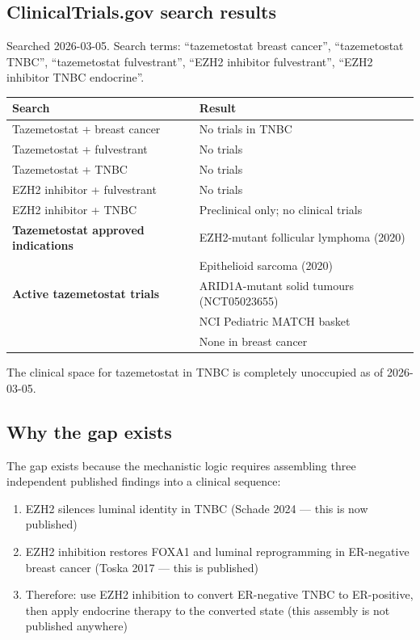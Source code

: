 \documentclass[12pt, a4paper]{article}
\begin{document}
\subsection{ClinicalTrials.gov search results}

Searched 2026-03-05. Search terms: ``tazemetostat
breast cancer'', ``tazemetostat TNBC'', ``tazemetostat
fulvestrant'', ``EZH2 inhibitor fulvestrant'',
``EZH2 inhibitor TNBC endocrine''.

\begin{center}
\begin{tabular}{ll}
\toprule
\textbf{Search} & \textbf{Result} \\
\midrule
Tazemetostat + breast cancer & No trials in TNBC \\
Tazemetostat + fulvestrant & No trials \\
Tazemetostat + TNBC & No trials \\
EZH2 inhibitor + fulvestrant & No trials \\
EZH2 inhibitor + TNBC & Preclinical only;
                         no clinical trials \\
\midrule
\textbf{Tazemetostat approved indications}
& EZH2-mutant follicular lymphoma (2020) \\
& Epithelioid sarcoma (2020) \\
\textbf{Active tazemetostat trials}
& ARID1A-mutant solid tumours
  (NCT05023655) \\
& NCI Pediatric MATCH basket \\
& None in breast cancer \\
\bottomrule
\end{tabular}
\end{center}

\noindent The clinical space for tazemetostat in TNBC
is completely unoccupied as of 2026-03-05.

\subsection{Why the gap exists}

The gap exists because the mechanistic logic requires
assembling three independent published findings into
a clinical sequence:

\begin{enumerate}
  \item EZH2 silences luminal identity in TNBC
        (Schade 2024 --- this is now published)
  \item EZH2 inhibition restores FOXA1 and luminal
        reprogramming in ER-negative breast cancer
        (Toska 2017 --- this is published)
  \item Therefore: use EZH2 inhibition to convert
        ER-negative TNBC to ER-positive, then apply
        endocrine therapy to the converted state
        (this assembly is not published anywhere)
\end{enumerate}
\end{document}
